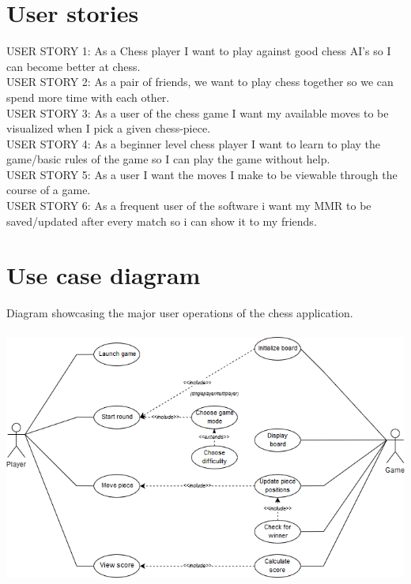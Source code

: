 \documentclass{article}
\begin{document}
    \section{User stories}
        USER STORY 1: As a Chess player I want to play against good chess AI’s 
        so I can become better at chess. \\
        
        \noindent
        USER STORY 2: As a pair of friends, we want to play chess together so we
        can spend more time with each other. \\
        
        \noindent
        USER STORY 3: As a user of the chess game I want my available moves to 
        be visualized when I pick a given chess-piece. \\
        
        \noindent
        USER STORY 4: As a beginner level chess player I want to learn to play 
        the game/basic rules of the game so I can play the game without help. \\
        
        \noindent
        USER STORY 5: As a user I want the moves I make to be viewable through 
        the course of a game. \\
        
        \noindent
        USER STORY 6: As a frequent user of the software i want my MMR to be 
        saved/updated after every match so i can show it to my friends. \\
	
	\vspace{30mm}
    \section{Use case diagram}
    Diagram showcasing the major user operations of the chess application. \\ \\
    \includegraphics[scale=0.6]{usecase-diagram.png}
    
\end{document}
